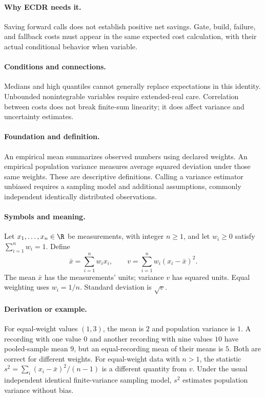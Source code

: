 \paragraph{Why ECDR needs it.}
Saving forward calls does not establish positive net savings. Gate,
build, failure, and fallback costs must appear in the same expected
cost calculation, with their actual conditional behavior when variable.
\paragraph{Conditions and connections.}
Medians and high quantiles cannot generally replace expectations in
this identity. Unbounded nonintegrable variables require extended-real
care. Correlation between costs does not break finite-sum linearity;
it does affect variance and uncertainty estimates.

\paragraph{Foundation and definition.}
An empirical mean summarizes observed numbers using declared weights.
An empirical population variance measures average squared deviation
under those same weights. These are descriptive definitions. Calling a
variance estimator unbiased requires a sampling model and additional
assumptions, commonly independent identically distributed observations.
\paragraph{Symbols and meaning.}
Let $x_1,\ldots,x_n\in\R$ be measurements, with integer $n\ge1$,
and let $w_i\ge0$ satisfy $\sum_{i=1}^{n}w_i=1$. Define
\[
 \bar x=\sum_{i=1}^{n}w_i x_i,
 \qquad v=\sum_{i=1}^{n}w_i(x_i-\bar x)^2.
\]
The mean $\bar x$ has the measurements' units; variance $v$ has squared
units. Equal weighting uses $w_i=1/n$. Standard deviation is $\sqrt v$.
\paragraph{Derivation or example.}
For equal-weight values $(1,3)$, the mean is $2$ and population
variance is $1$. A recording with one value $0$ and another recording
with nine values $10$ have pooled-sample mean $9$, but an equal-recording
mean of their means is $5$. Both are correct for different weights.
For equal-weight data with $n>1$, the statistic
$s^2=\sum_i(x_i-\bar x)^2/(n-1)$ is a different quantity from $v$.
Under the usual independent identical finite-variance sampling model,
$s^2$ estimates population variance without bias.
